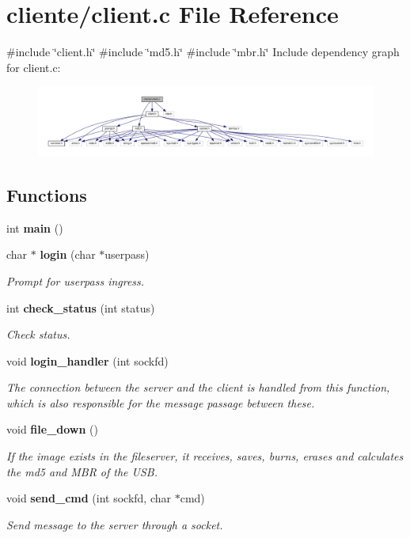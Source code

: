 \section{cliente/client.c File Reference}
\label{client_8c}
{\ttfamily \#include \char`\"{}client.\+h\char`\"{}}\newline
{\ttfamily \#include \char`\"{}md5.\+h\char`\"{}}\newline
{\ttfamily \#include \char`\"{}mbr.\+h\char`\"{}}\newline
Include dependency graph for client.\+c\+:\nopagebreak
\begin{figure}[H]
\begin{center}
\leavevmode
\includegraphics[width=350pt]{client_8c__incl}
\end{center}
\end{figure}
\subsection*{Functions}
\begin{DoxyCompactItemize}
\item 
int \textbf{ main} ()
\item 
char $\ast$ \textbf{ login} (char $\ast$userpass)
\begin{DoxyCompactList}\small\item\em Prompt for userpass ingress. \end{DoxyCompactList}\item 
int \textbf{ check\+\_\+status} (int status)
\begin{DoxyCompactList}\small\item\em Check status. \end{DoxyCompactList}\item 
void \textbf{ login\+\_\+handler} (int sockfd)
\begin{DoxyCompactList}\small\item\em The connection between the server and the client is handled from this function, which is also responsible for the message passage between these. \end{DoxyCompactList}\item 
void \textbf{ file\+\_\+down} ()
\begin{DoxyCompactList}\small\item\em If the image exists in the fileserver, it receives, saves, burns, erases and calculates the md5 and M\+BR of the U\+SB. \end{DoxyCompactList}\item 
void \textbf{ send\+\_\+cmd} (int sockfd, char $\ast$cmd)
\begin{DoxyCompactList}\small\item\em Send message to the server through a socket. \end{DoxyCompactList}\end{DoxyCompactItemize}


